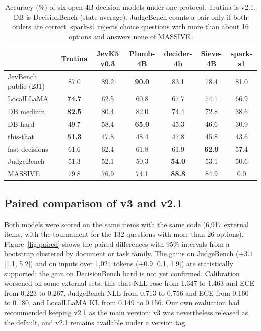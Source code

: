 \documentclass[10pt]{article}
\begin{document}
\begin{table}[t]
\centering\small
\caption{Accuracy (\%) of six open 4B decision models under one protocol. Trutina is v2.1. DB is DecisionBench (state average). JudgeBench counts a pair only if both orders are correct. spark-s1 rejects choice questions with more than about 16 options and answers none of MASSIVE.}
\label{tab:peers}
\begin{tabular}{lcccccc}
\toprule
 & Trutina & JevK5 v0.3 & Plumb-4B & decider-4b & Sieve-4B & spark-s1 \\
\midrule
JevBench public (231) & 87.0 & 89.2 & \textbf{90.0} & 83.1 & 78.4 & 81.0 \\
LocalLLaMA & \textbf{74.7} & 62.5 & 60.8 & 67.7 & 74.1 & 66.9 \\
DB medium & \textbf{82.5} & 80.4 & 82.0 & 74.4 & 72.8 & 38.6 \\
DB hard & 49.7 & 58.4 & \textbf{65.0} & 45.3 & 46.6 & 30.9 \\
this-that & \textbf{51.3} & 47.8 & 48.4 & 47.8 & 45.8 & 43.6 \\
fast-decisions & 61.6 & 62.4 & 61.8 & 61.9 & \textbf{62.9} & 57.4 \\
JudgeBench & 51.3 & 52.1 & 50.3 & \textbf{54.0} & 53.1 & 50.6 \\
MASSIVE & 79.8 & 76.9 & 74.1 & \textbf{88.8} & 84.9 & 0.0 \\
\bottomrule
\end{tabular}
\end{table}

\subsection{Paired comparison of v3 and v2.1}
\label{sec:paired}

Both models were scored on the same items with the same code (6,917 external items, with the tournament for the 132 questions with more than 26 options).
Figure~\ref{fig:paired} shows the paired differences with 95\% intervals from a bootstrap clustered by document or task family.
The gains on JudgeBench ($+3.1$ [1.1, 5.2]) and on inputs over 1,024 tokens ($+0.9$ [0.1, 1.9]) are statistically supported; the gain on DecisionBench hard is not yet confirmed.
Calibration worsened on some external sets: this-that NLL rose from 1.347 to 1.463 and ECE from 0.223 to 0.267, JudgeBench NLL from 0.713 to 0.756 and ECE from 0.160 to 0.180, and LocalLLaMA KL from 0.149 to 0.156.
Our own evaluation had recommended keeping v2.1 as the main version; v3 was nevertheless released as the default, and v2.1 remains available under a version tag.
\end{document}
